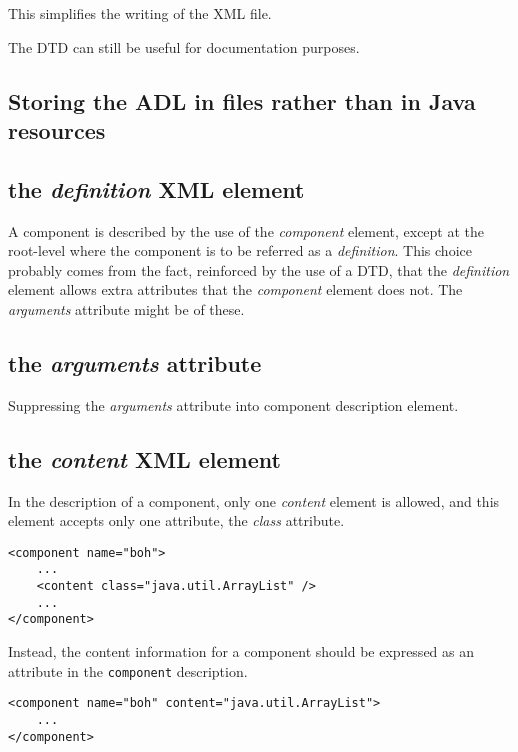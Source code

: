 \documentclass{article}
\newcommand{\xml}[1]{\textsl{#1}}
\begin{document}
This simplifies the writing of the XML file.

The DTD can still be useful for documentation purposes.


\subsection{Storing the ADL in files rather than in Java resources}




\subsection{the \xml{definition} XML element}

A component is described by the use of the \xml{component} element, except at the root-level
where the component is to be referred as a  \xml{definition}. This choice probably comes
from the fact, reinforced by the use of a DTD, that the \xml{definition} element allows
extra attributes that the \xml{component} element does not. The \xml{arguments}  
attribute might be of these.


\subsection{the \xml{arguments} attribute}

Suppressing the \xml{arguments} attribute into component description element.

\subsection{the \xml{content} XML element}

In the description of a component, only one \xml{content} element is allowed, and this element accepts
only one attribute, the \xml{class} attribute. 

\begin{lstlisting}
<component name="boh">
	...
	<content class="java.util.ArrayList" />
	...
</component>
\end{lstlisting}


Instead, the content information for a component should be expressed as
an attribute in the \texttt{component} description.

\begin{lstlisting}
<component name="boh" content="java.util.ArrayList">
	...
</component>
\end{lstlisting}
\end{document}
